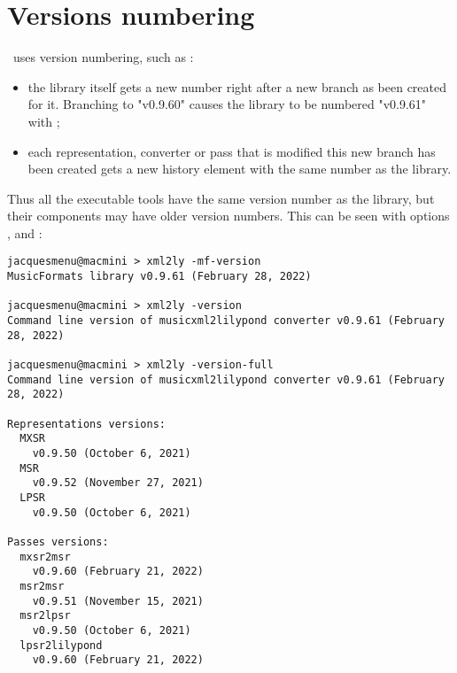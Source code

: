 



\chapter{Versions numbering}\label{Versions numbering}

\mf\ uses  version numbering, such as :%
\begin{itemize}
\item the library itself gets a new number right after a new branch as been created for it. Branching to "v0.9.60" causes the library to be numbered "v0.9.61" with ;

\item each representation, converter or pass that is modified this new branch has been created gets a new history element with the same number as the library.
\end{itemize}

Thus all the executable tools have the same version number as the library, but their components may have older version numbers. This can be seen with options ,  and  :
\begin{lstlisting}[language=Terminal]%%%JMI do this again
jacquesmenu@macmini > xml2ly -mf-version
MusicFormats library v0.9.61 (February 28, 2022)

jacquesmenu@macmini > xml2ly -version
Command line version of musicxml2lilypond converter v0.9.61 (February 28, 2022)

jacquesmenu@macmini > xml2ly -version-full
Command line version of musicxml2lilypond converter v0.9.61 (February 28, 2022)

Representations versions:
  MXSR
    v0.9.50 (October 6, 2021)
  MSR
    v0.9.52 (November 27, 2021)
  LPSR
    v0.9.50 (October 6, 2021)

Passes versions:
  mxsr2msr
    v0.9.60 (February 21, 2022)
  msr2msr
    v0.9.51 (November 15, 2021)
  msr2lpsr
    v0.9.50 (October 6, 2021)
  lpsr2lilypond
    v0.9.60 (February 21, 2022)
\end{lstlisting}
